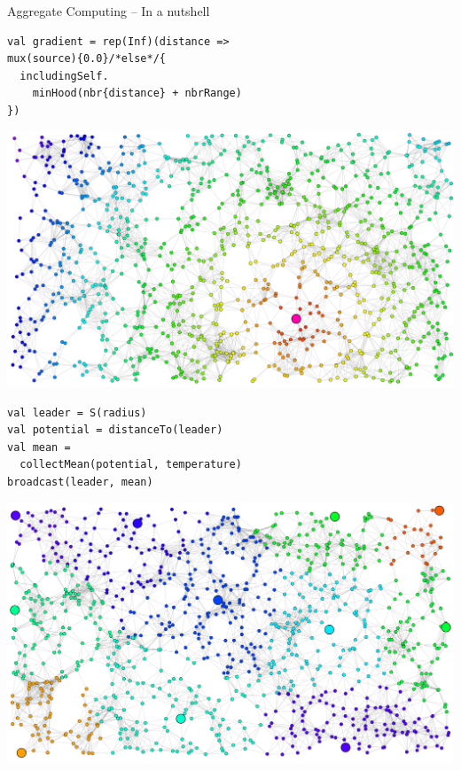 \documentclass[9pt, aspectratio=169, handout]{beamer}
\begin{document}
\begin{frame}[fragile]{Aggregate Computing -- In a nutshell}
  \begin{multicols}{2}
    \begin{card}[Gradient]
    \begin{verbatim}
val gradient = rep(Inf)(distance =>
mux(source){0.0}/*else*/{
  includingSelf.
    minHood(nbr{distance} + nbrRange)
})
    \end{verbatim}
    \centering
    \includegraphics[width=0.7\linewidth]{img/result-gradient.png}
    \end{card}
    \begin{card}
    \begin{verbatim}
val leader = S(radius)
val potential = distanceTo(leader)
val mean =
  collectMean(potential, temperature)
broadcast(leader, mean)
  \end{verbatim}  
  \centering
  \includegraphics[width=0.68\linewidth]{img/distributed-sensing.png}   
  \end{card}
  \end{multicols}
\end{frame}
\end{document}
